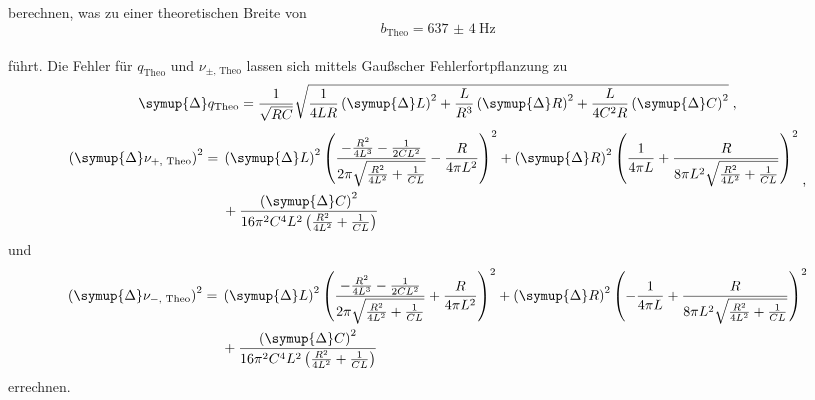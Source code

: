 berechnen, was zu einer theoretischen Breite von 
\begin{equation*}
    b_\text{Theo} = \SI{637(4)}{\hertz}
\end{equation*}\\
führt. 
Die Fehler für $q_\text{Theo}$ und $\nu_{\pm\text{, Theo}}$ lassen sich mittels Gaußscher Fehlerfortpflanzung zu
\begin{equation}
    \symup{\Delta} q_\text{Theo} = \frac{1}{\sqrt{RC}} \sqrt{\frac{1}{4LR} \left ( \symup{\Delta} L \right )^2 + \frac{L}{R^3} \left ( \symup{\Delta} R \right )^2 
    + \frac{L}{4C^2R} \left ( \symup{\Delta} C \right )^2} \; \text{,}
\end{equation}
\begin{equation}
    \begin{split}
    \left ( \symup{\Delta} \nu_{+\text{, Theo}} \right )^2= {} & \left ( \symup{\Delta} L \right)^{2} \left(\frac{- \frac{R^{2}}{4 L^{3}} - \frac{1}{2 C L^{2}}}{2 \pi \sqrt{\frac{R^{2}}{4 L^{2}} + \frac{1}{C L}}} - \frac{R}{4 \pi L^{2}}\right)^{2} + \left ( \symup{\Delta} R \right)^{2} \left(\frac{1}{4 \pi L} + \frac{R}{8 \pi L^{2} \sqrt{\frac{R^{2}}{4 L^{2}} + \frac{1}{C L}}}\right)^{2} \\
    & + \frac{\left ( \symup{\Delta} C \right)^{2}}{16 \pi^{2} C^{4} L^{2} \left(\frac{R^{2}}{4L^{2}} + \frac{1}{C L}\right)}
    \end{split} \; \text{,}
\end{equation}
und 
\begin{equation}
    \begin{split}
    \left ( \symup{\Delta} \nu_{-\text{, Theo}} \right )^2= {} & \left ( \symup{\Delta} L \right)^{2} \left(\frac{- \frac{R^{2}}{4 L^{3}} - \frac{1}{2 C L^{2}}}{2 \pi \sqrt{\frac{R^{2}}{4 L^{2}} + \frac{1}{C L}}} + \frac{R}{4 \pi L^{2}}\right)^{2} + \left ( \symup{\Delta} R \right)^{2} \left(- \frac{1}{4 \pi L} + \frac{R}{8 \pi L^{2} \sqrt{\frac{R^{2}}{4 L^{2}} + \frac{1}{C L}}}\right)^{2} \\
    & + \frac{\left ( \symup{\Delta} C \right)^{2}}{16 \pi^{2} C^{4} L^{2} \left(\frac{R^{2}}{4 L^{2}} + \frac{1}{C L}\right)}
    \end{split}
\end{equation}
errechnen.